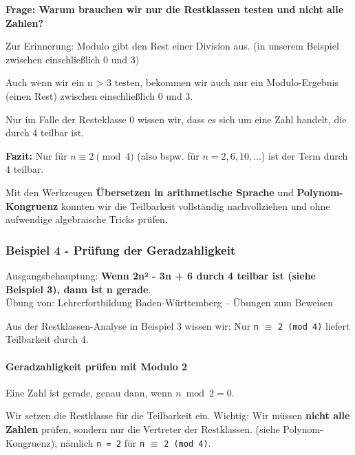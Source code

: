 \documentclass{article}
\begin{document}
      \textbf{Frage: Warum brauchen wir nur die Restklassen testen und nicht alle Zahlen?}
      
Zur Erinnerung: Modulo gibt den Rest einer Division aus. (in unserem Beispiel zwischen einschließlich 0 und 3)

      
Auch wenn wir ein n > 3 testen, bekommen wir auch nur ein Modulo-Ergebnis (einen Rest) zwischen einschließlich 0 und 3.

      
Nur im Falle der Resteklasse 0 wissen wir, dass es sich um eine Zahl handelt, die durch 4 teilbar ist.


      

      	\textbf{Fazit:} Nur für $n \equiv 2 \pmod{4}$ (also bspw. für $n = 2, 6, 10, \dots$) ist der Term durch 4 teilbar.
      


      

        Mit den Werkzeugen \textbf{Übersetzen in arithmetische Sprache} und \textbf{Polynom-Kongruenz} konnten wir die Teilbarkeit vollständig nachvollziehen und ohne aufwendige algebraische Tricks prüfen.
      


      \subsubsection{Beispiel 4 - Prüfung der Geradzahligkeit}

      

        Ausgangsbehauptung: \textbf{Wenn 2n² - 3n + 6 durch 4 teilbar ist (siehe Beispiel 3), dann ist n gerade}.\\
        Übung von: Lehrerfortbildung Baden-Württemberg – Übungen zum Beweisen
      


      

        Aus der Restklassen-Analyse in Beispiel 3 wissen wir: Nur \texttt{n} $\equiv$ \texttt{2 (mod 4)} liefert Teilbarkeit durch 4.
      


      \paragraph{Geradzahligkeit prüfen mit Modulo 2}
      

        Eine Zahl ist gerade, genau dann, wenn $n \bmod 2 = 0$.
      


      

        Wir setzen die Restklasse für die Teilbarkeit ein. Wichtig: Wir müssen \textbf{nicht alle Zahlen} prüfen, sondern nur die Vertreter der Restklassen. (siehe Polynom-Kongruenz), nämlich \texttt{n = 2} für \texttt{n} $\equiv$ \texttt{2 (mod 4)}.
      
\end{document}
